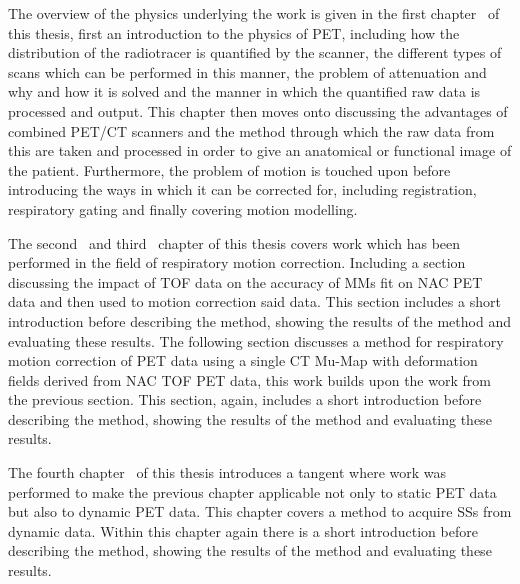         The overview of the physics underlying the work is given in the first chapter~ of this thesis, first an introduction to the physics of \gls{PET}, including how the distribution of the radiotracer is quantified by the scanner, the different types of scans which can be performed in this manner, the problem of attenuation and why and how it is solved and the manner in which the quantified raw data is processed and output. This chapter then moves onto discussing the advantages of combined \gls{PET}/\gls{CT} scanners and the method through which the raw data from this are taken and processed in order to give an anatomical or functional image of the patient. Furthermore, the problem of motion is touched upon before introducing the ways in which it can be corrected for, including registration, respiratory gating and finally covering motion modelling.
        
        The second~ and third~ chapter of this thesis covers work which has been performed in the field of respiratory motion correction. Including a section discussing the impact of \gls{TOF} data on the accuracy of \glspl{MM} fit on \gls{NAC} \gls{PET} data and then used to motion correction said data. This section includes a short introduction before describing the method, showing the results of the method and evaluating these results. The following section discusses a method for respiratory motion correction of \gls{PET} data using a single \gls{CT} \gls{Mu-Map} with deformation fields derived from \gls{NAC} \gls{TOF} \gls{PET} data, this work builds upon the work from the previous section. This section, again, includes a short introduction before describing the method, showing the results of the method and evaluating these results.
        
        The fourth chapter~ of this thesis introduces a tangent where work was performed to make the previous chapter applicable not only to static \gls{PET} data but also to dynamic \gls{PET} data. This chapter covers a method to acquire \glspl{SS} from dynamic data.%
        Within this chapter again there is a short introduction before describing the method, showing the results of the method and evaluating these results.
        
